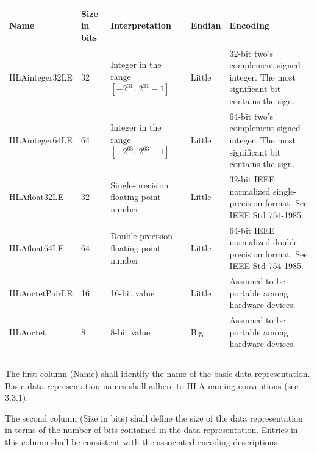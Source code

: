 \newpage
{}
\begingroup
\fontsize{8.0}{9.25}\selectfont
\setlength{\tabcolsep}{2.3pt}
\renewcommand{\arraystretch}{1.16}
\noindent\begin{tabularx}{\textwidth}{|L{88pt}|C{34pt}|L{112pt}|C{43pt}|Y|}
\hline
\centering\bfseries Name & \bfseries Size in bits & \centering\bfseries Interpretation & \bfseries Endian & \centering\arraybackslash\bfseries Encoding \\
\hline
HLAinteger32LE & 32 & Integer in the range $[-2^{31},\,2^{31}-1]$ & Little & 32-bit two's complement signed integer. The most significant bit contains the sign. \\
\hline
HLAinteger64LE & 64 & Integer in the range $[-2^{63},\,2^{63}-1]$ & Little & 64-bit two's complement signed integer. The most significant bit contains the sign. \\
\hline
HLAfloat32LE & 32 & Single-precision floating point number & Little & 32-bit IEEE normalized single-precision format. See IEEE Std 754-1985. \\
\hline
HLAfloat64LE & 64 & Double-precision floating point number & Little & 64-bit IEEE normalized double-precision format. See IEEE Std 754-1985. \\
\hline
HLAoctetPairLE & 16 & 16-bit value & Little & Assumed to be portable among hardware devices. \\
\hline
HLAoctet & 8 & 8-bit value & Big & Assumed to be portable among hardware devices. \\
\hline
{} &  &  &  &  \\
\hline
{} &  &  &  &  \\
\hline
\end{tabularx}
\endgroup

The first column (Name) shall identify the name of the basic data representation. Basic data representation names shall adhere to HLA naming conventions (see 3.3.1).

The second column (Size in bits) shall define the size of the data representation in terms of the number of bits contained in the data representation. Entries in this column shall be consistent with the associated encoding descriptions.

